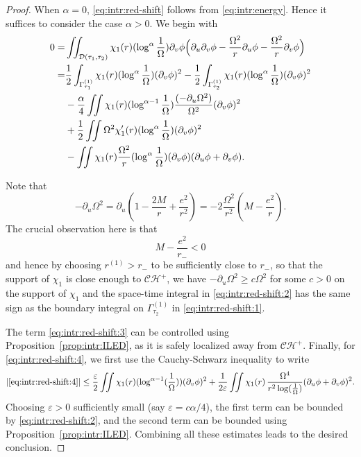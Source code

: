 \documentclass[12 pt, reqno]{amsart}
\theoremstyle{definition}
\theoremstyle{remark}
\numberwithin{equation}{section}
\newcommand{\abs}[1]{\vert#1\vert}
\newcommand{\rd}{\partial}
\newcommand{\bb}{\Big}
\newcommand{\0}{\emptyset}
\newcommand{\alp}{\alpha}
\newcommand{\Gmm}{\Gamma}
\newcommand{\Omg}{\Omega}
\newcommand{\calC}{\mathcal C}
\newcommand{\calD}{\mathcal D}
\newcommand{\calH}{\mathcal H}
\newcommand{\CH}{\calC \calH^{+}}		%
\begin{document}
\begin{proof} 
When $\alp = 0$, \eqref{eq:intr:red-shift} follows from \eqref{eq:intr:energy}. Hence it suffices to consider the case $\alp > 0$. We begin with
 \begin{align}
	0 =& \iint_{\calD(\tau_{1}, \tau_{2})} \chi_{1}(r) (\log^{\alp} \frac{1}{\Omg}) \rd_{v} \phi 
				\bb( \rd_{u} \rd_{v} \phi - \frac{\Omg^{2}}{r} \rd_{u} \phi - \frac{\Omg^{2}}{r} \rd_{v} \phi \bb) \notag \\
	=& \frac{1}{2} \int_{\Gmm^{(1)}_{\tau_{1}}} \chi_{1}(r) (\log^{\alp} \frac{1}{\Omg}) (\rd_{v} \phi)^{2}
		- \frac{1}{2} \int_{\Gmm^{(1)}_{\tau_{2}}} \chi_{1}(r) (\log^{\alp} \frac{1}{\Omg}) (\rd_{v} \phi)^{2} \label{eq:intr:red-shift:1} \\
	& - \frac{\alp}{4} \iint \chi_{1}(r) (\log^{\alp-1} \frac{1}{\Omg}) \frac{(- \rd_{u} \Omg^{2})}{\Omg^{2}} (\rd_{v} \phi)^{2} \label{eq:intr:red-shift:2}\\
	&  + \frac{1}{2} \iint \Omg^{2} \chi'_{1}(r) (\log^{\alp} \frac{1}{\Omg}) (\rd_{v }\phi)^{2} \label{eq:intr:red-shift:3}\\
	 &  - \iint \chi_{1}(r) \frac{\Omg^{2}}{r} (\log^{\alp} \frac{1}{\Omg}) (\rd_{v} \phi) (\rd_{u} \phi + \rd_{v} \phi). \label{eq:intr:red-shift:4}
\end{align}

Note that
\begin{equation*}
	- \rd_{u} \Omg^{2} = \rd_{u} (1- \frac{2M}{r} + \frac{e^{2}}{r^{2}} ) = - 2 \frac{\Omg^{2}}{r^{2}} (M - \frac{e^{2}}{r}).
\end{equation*}
The crucial observation here is that
\begin{equation*}
	M - \frac{e^{2}}{r_{-}} < 0
\end{equation*}
and hence by choosing $r^{(1)} > r_{-}$ to be sufficiently close to $r_{-}$, so that the support of $\chi_{1}$ is close enough to $\CH$, we have $- \rd_{u} \Omg^{2} \geq c \Omg^{2}$ for some $c > 0$ on the support of $\chi_{1}$ and the space-time integral in \eqref{eq:intr:red-shift:2} has the same sign as the boundary integral on $\Gmm^{(1)}_{\tau_{2}}$ in \eqref{eq:intr:red-shift:1}. 

The term \eqref{eq:intr:red-shift:3} can be controlled using Proposition~\ref{prop:intr:ILED}, as it is safely localized away from $\CH$. Finally, for \eqref{eq:intr:red-shift:4}, we first use the Cauchy-Schwarz inequality to write
\begin{equation*}
	\abs{\eqref{eq:intr:red-shift:4}}
	\leq \frac{\varepsilon}{2} \iint \chi_{1}(r) (\log^{\alp-1} (\frac{1}{\Omg})) (\rd_{v} \phi)^{2} + \frac{1}{2 \varepsilon} \iint \chi_{1}(r) \, \frac{\Omg^{4}}{r^{2} \log (\frac{1}{\Omg})} (\rd_{u} \phi + \rd_{v} \phi)^{2} .
\end{equation*}
Choosing $\varepsilon > 0$ sufficiently small (say $\varepsilon = c\alp/4$), the first term can be bounded by \eqref{eq:intr:red-shift:2}, and the second term can be bounded using Proposition~\ref{prop:intr:ILED}. Combining all these estimates leads to the desired conclusion. \qedhere
\end{proof}
\end{document}
